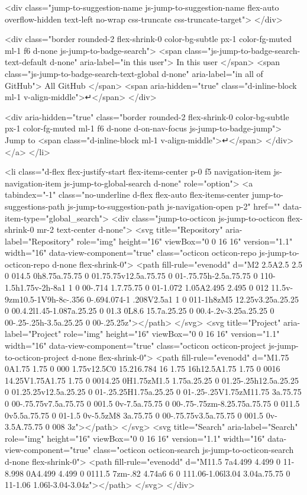     <div class="jump-to-suggestion-name js-jump-to-suggestion-name flex-auto overflow-hidden text-left no-wrap css-truncate css-truncate-target">
    </div>

    <div class="border rounded-2 flex-shrink-0 color-bg-subtle px-1 color-fg-muted ml-1 f6 d-none js-jump-to-badge-search">
      <span class="js-jump-to-badge-search-text-default d-none" aria-label="in this user">
        In this user
      </span>
      <span class="js-jump-to-badge-search-text-global d-none" aria-label="in all of GitHub">
        All GitHub
      </span>
      <span aria-hidden="true" class="d-inline-block ml-1 v-align-middle">↵</span>
    </div>

    <div aria-hidden="true" class="border rounded-2 flex-shrink-0 color-bg-subtle px-1 color-fg-muted ml-1 f6 d-none d-on-nav-focus js-jump-to-badge-jump">
      Jump to
      <span class="d-inline-block ml-1 v-align-middle">↵</span>
    </div>
  </a>
</li>

  

<li class="d-flex flex-justify-start flex-items-center p-0 f5 navigation-item js-navigation-item js-jump-to-global-search d-none" role="option">
  <a tabindex="-1" class="no-underline d-flex flex-auto flex-items-center jump-to-suggestions-path js-jump-to-suggestion-path js-navigation-open p-2" href="" data-item-type="global_search">
    <div class="jump-to-octicon js-jump-to-octicon flex-shrink-0 mr-2 text-center d-none">
      <svg title="Repository" aria-label="Repository" role="img" height="16" viewBox="0 0 16 16" version="1.1" width="16" data-view-component="true" class="octicon octicon-repo js-jump-to-octicon-repo d-none flex-shrink-0">
    <path fill-rule="evenodd" d="M2 2.5A2.5 2.5 0 014.5 0h8.75a.75.75 0 01.75.75v12.5a.75.75 0 01-.75.75h-2.5a.75.75 0 110-1.5h1.75v-2h-8a1 1 0 00-.714 1.7.75.75 0 01-1.072 1.05A2.495 2.495 0 012 11.5v-9zm10.5-1V9h-8c-.356 0-.694.074-1 .208V2.5a1 1 0 011-1h8zM5 12.25v3.25a.25.25 0 00.4.2l1.45-1.087a.25.25 0 01.3 0L8.6 15.7a.25.25 0 00.4-.2v-3.25a.25.25 0 00-.25-.25h-3.5a.25.25 0 00-.25.25z"></path>
</svg>
      <svg title="Project" aria-label="Project" role="img" height="16" viewBox="0 0 16 16" version="1.1" width="16" data-view-component="true" class="octicon octicon-project js-jump-to-octicon-project d-none flex-shrink-0">
    <path fill-rule="evenodd" d="M1.75 0A1.75 1.75 0 000 1.75v12.5C0 15.216.784 16 1.75 16h12.5A1.75 1.75 0 0016 14.25V1.75A1.75 1.75 0 0014.25 0H1.75zM1.5 1.75a.25.25 0 01.25-.25h12.5a.25.25 0 01.25.25v12.5a.25.25 0 01-.25.25H1.75a.25.25 0 01-.25-.25V1.75zM11.75 3a.75.75 0 00-.75.75v7.5a.75.75 0 001.5 0v-7.5a.75.75 0 00-.75-.75zm-8.25.75a.75.75 0 011.5 0v5.5a.75.75 0 01-1.5 0v-5.5zM8 3a.75.75 0 00-.75.75v3.5a.75.75 0 001.5 0v-3.5A.75.75 0 008 3z"></path>
</svg>
      <svg title="Search" aria-label="Search" role="img" height="16" viewBox="0 0 16 16" version="1.1" width="16" data-view-component="true" class="octicon octicon-search js-jump-to-octicon-search d-none flex-shrink-0">
    <path fill-rule="evenodd" d="M11.5 7a4.499 4.499 0 11-8.998 0A4.499 4.499 0 0111.5 7zm-.82 4.74a6 6 0 111.06-1.06l3.04 3.04a.75.75 0 11-1.06 1.06l-3.04-3.04z"></path>
</svg>
    </div>

